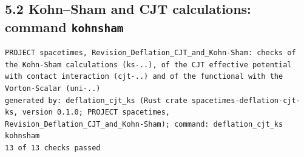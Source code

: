 \documentclass[
  10pt,
]{article}
\begin{document}
\hypertarget{kohnsham-and-cjt-calculations-command-kohnsham}{%
\subsection{\texorpdfstring{5.2 Kohn--Sham and CJT calculations: command
\texttt{kohnsham}}{5.2 Kohn--Sham and CJT calculations: command kohnsham}}\label{kohnsham-and-cjt-calculations-command-kohnsham}}

\begin{verbatim}
PROJECT spacetimes, Revision_Deflation_CJT_and_Kohn-Sham: checks of the Kohn-Sham calculations (ks-..), of the CJT effective potential with contact interaction (cjt-..) and of the functional with the Vorton-Scalar (uni-..)
generated by: deflation_cjt_ks (Rust crate spacetimes-deflation-cjt-ks, version 0.1.0; PROJECT spacetimes, Revision_Deflation_CJT_and_Kohn-Sham); command: deflation_cjt_ks kohnsham
13 of 13 checks passed


\end{verbatim}
\end{document}
